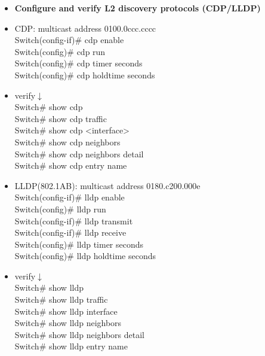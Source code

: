 \documentclass{article}
\begin{document}
\begin{itemize}
  \item \textbf{Configure and verify L2 discovery protocols (CDP/LLDP)}
  	\item[] CDP: multicast address 0100.0ccc.cccc\\
  		Switch(config-if)\# cdp enable\\
  		Switch(config)\# cdp run\\
  		Switch(config)\# cdp timer seconds\\
  		Switch(config)\# cdp holdtime seconds
  	\item[] verify$\downarrow$\\
  		Switch\# show cdp\\
  		Switch\# show cdp traffic\\
  		Switch\# show cdp \textless interface\textgreater\\
  		Switch\# show cdp neighbors\\
  		Switch\# show cdp neighbors detail\\
  		Switch\# show cdp entry name
  	\item[] LLDP(802.1AB): multicast address 0180.c200.000e\\
  		Switch(config-if)\# lldp enable\\
  		Switch(config)\# lldp run\\
  		Switch(config-if)\# lldp transmit\\
  		Switch(config-if)\# lldp receive\\
  		Switch(config)\# lldp timer seconds\\
  		Switch(config)\# lldp holdtime seconds
  	\item verify$\downarrow$\\
  		Switch\# show lldp\\
  		Switch\# show lldp traffic\\
  		Switch\# show lldp interface\\
  		Switch\# show lldp neighbors\\
  		Switch\# show lldp neighbors detail\\
  		Switch\# show lldp entry name
  		

\end{itemize}
\end{document}

